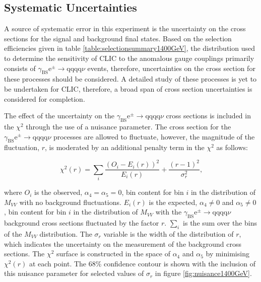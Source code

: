 
\subsection{Systematic Uncertainties}
A source of systematic error in this experiment is the uncertainty on the cross sections for the signal and background final states.  Based on the selection efficiencies given in table \ref{table:selectionsummary1400GeV}, the distribution used to determine the sensitivity of CLIC to the anomalous gauge couplings primarily consists of $\gamma_{\text{BS}}\text{e}^{\pm} \rightarrow \text{qqqq}\nu$ events, therefore, uncertainties on the cross section for these processes should be considered.  A detailed study of these processes is yet to be undertaken for CLIC, therefore, a broad span of cross section uncertainties is considered for completion.

The effect of the uncertainty on the $\gamma_{\text{BS}}\text{e}^{\pm} \rightarrow \text{qqqq}\nu$ cross sections is included in the $\chi^{2}$ through the use of a nuisance parameter.  The cross section for the $\gamma_{\text{BS}}\text{e}^{\pm} \rightarrow \text{qqqq}\nu$ processes are allowed to fluctuate, however, the magnitude of the fluctuation, $r$, is moderated by an additional penalty term in the $\chi^{2}$ as follows:

\begin{equation}
\chi^{2}(r) = \sum_{i} \frac{(O_{i} - E_{i}(r))^{2}}{E_{i}(r)} + \frac{(r-1)^{2}}{\sigma_{r}^{2}} \text{,}
\end{equation}

\noindent where $O_{i}$ is the observed, $\alpha_{4} = \alpha_{5} = 0$, bin content for bin $i$ in the distribution of $M_{VV}$ with no background fluctuations.  $E_{i}(r)$ is the expected, $\alpha_{4} \neq 0$ and $\alpha_{5} \neq 0$, bin content for bin $i$ in the distribution of $M_{VV}$ with the $\gamma_{\text{BS}}\text{e}^{\pm} \rightarrow \text{qqqq}\nu$ background cross sections fluctuated by the factor $r$.  $\sum_{i}$ is the sum over the bins of the $M_{VV}$ distribution.  The $\sigma_{r}$ variable is the width of the distribution of $r$, which indicates the uncertainty on the measurement of the background cross sections.  The $\chi^{2}$ surface is constructed in the space of $\alpha_{4}$ and $\alpha_{5}$ by minimising $\chi^{2}(r)$ at each point.  The 68\% confidence contour is shown with the inclusion of this nuisance parameter for selected values of $\sigma_{r}$ in figure \ref{fig:nuisance1400GeV}.   

